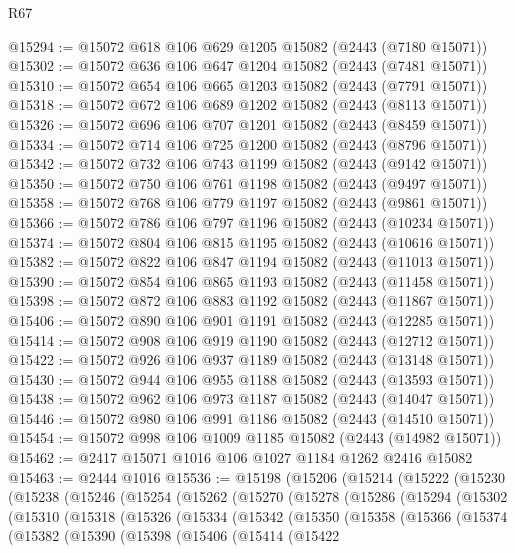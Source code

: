 \begin{lexlean}{R67}
\begin{coremodule}
@15294 := @15072 @618 @106 @629 @1205 @15082 (@2443 (@7180 @15071))
@15302 := @15072 @636 @106 @647 @1204 @15082 (@2443 (@7481 @15071))
@15310 := @15072 @654 @106 @665 @1203 @15082 (@2443 (@7791 @15071))
@15318 := @15072 @672 @106 @689 @1202 @15082 (@2443 (@8113 @15071))
@15326 := @15072 @696 @106 @707 @1201 @15082 (@2443 (@8459 @15071))
@15334 := @15072 @714 @106 @725 @1200 @15082 (@2443 (@8796 @15071))
@15342 := @15072 @732 @106 @743 @1199 @15082 (@2443 (@9142 @15071))
@15350 := @15072 @750 @106 @761 @1198 @15082 (@2443 (@9497 @15071))
@15358 := @15072 @768 @106 @779 @1197 @15082 (@2443 (@9861 @15071))
@15366 := @15072 @786 @106 @797 @1196 @15082 (@2443 (@10234 @15071))
@15374 := @15072 @804 @106 @815 @1195 @15082 (@2443 (@10616 @15071))
@15382 := @15072 @822 @106 @847 @1194 @15082 (@2443 (@11013 @15071))
@15390 := @15072 @854 @106 @865 @1193 @15082 (@2443 (@11458 @15071))
@15398 := @15072 @872 @106 @883 @1192 @15082 (@2443 (@11867 @15071))
@15406 := @15072 @890 @106 @901 @1191 @15082 (@2443 (@12285 @15071))
@15414 := @15072 @908 @106 @919 @1190 @15082 (@2443 (@12712 @15071))
@15422 := @15072 @926 @106 @937 @1189 @15082 (@2443 (@13148 @15071))
@15430 := @15072 @944 @106 @955 @1188 @15082 (@2443 (@13593 @15071))
@15438 := @15072 @962 @106 @973 @1187 @15082 (@2443 (@14047 @15071))
@15446 := @15072 @980 @106 @991 @1186 @15082 (@2443 (@14510 @15071))
@15454 := @15072 @998 @106 @1009 @1185 @15082 (@2443 (@14982 @15071))
@15462 := @2417 @15071 @1016 @106 @1027 @1184 @1262 @2416 @15082
@15463 := @2444 @1016
@15536 := @15198
    (@15206
      (@15214
        (@15222
          (@15230
            (@15238
              (@15246
                (@15254
                  (@15262
                    (@15270
                      (@15278
                        (@15286
                          (@15294
                            (@15302
                              (@15310
                                (@15318
                                  (@15326
                                    (@15334
                                      (@15342
                                        (@15350
                                          (@15358
                                            (@15366
                                              (@15374
                                                (@15382
                                                  (@15390
                                                    (@15398
                                                      (@15406
                                                        (@15414
                                                          (@15422

\end{coremodule}
\end{lexlean}

